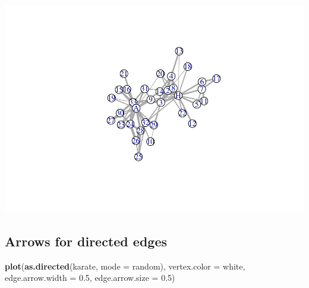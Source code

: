 \documentclass[
]{book}
\newenvironment{Shaded}{\begin{snugshade}}{\end{snugshade}}
\newcommand{\AttributeTok}[1]{\textcolor[rgb]{0.13,0.29,0.53}{#1}}
\newcommand{\FloatTok}[1]{\textcolor[rgb]{0.00,0.00,0.81}{#1}}
\newcommand{\FunctionTok}[1]{\textcolor[rgb]{0.13,0.29,0.53}{\textbf{#1}}}
\newcommand{\NormalTok}[1]{#1}
\newcommand{\SpecialCharTok}[1]{\textcolor[rgb]{0.81,0.36,0.00}{\textbf{#1}}}
\newcommand{\StringTok}[1]{\textcolor[rgb]{0.31,0.60,0.02}{#1}}
\begin{document}
\begin{Shaded}
\end{Shaded}

\includegraphics{bookdown-demo_files/figure-latex/unnamed-chunk-185-1.pdf}

\subsection{Arrows for directed edges}\label{arrows-for-directed-edges}

\begin{Shaded}
\begin{Highlighting}[]
\FunctionTok{plot}\NormalTok{(}\FunctionTok{as.directed}\NormalTok{(karate, }\AttributeTok{mode =} \StringTok{\textquotesingle{}random\textquotesingle{}}\NormalTok{), }\AttributeTok{vertex.color =} \StringTok{\textquotesingle{}white\textquotesingle{}}\NormalTok{, }\AttributeTok{edge.arrow.width =} \FloatTok{0.5}\NormalTok{, }\AttributeTok{edge.arrow.size =} \FloatTok{0.5}\NormalTok{)}
\end{Highlighting}
\end{Shaded}
\end{document}
